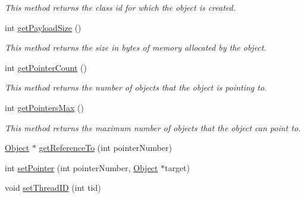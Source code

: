 \begin{DoxyCompactItemize}
\begin{DoxyCompactList}\small\item\em This method returns the class id for which the object is created. \end{DoxyCompactList}\item 
\hypertarget{classtrace_gen_1_1_object_a949827546864cff9dd90328f9efaafcc}{}int \hyperlink{classtrace_gen_1_1_object_a949827546864cff9dd90328f9efaafcc}{get\+Payload\+Size} ()\label{classtrace_gen_1_1_object_a949827546864cff9dd90328f9efaafcc}

\begin{DoxyCompactList}\small\item\em This method returns the size in bytes of memory allocated by the object. \end{DoxyCompactList}\item 
\hypertarget{classtrace_gen_1_1_object_a3446d46c58acdb776d255dfb5ace0326}{}int \hyperlink{classtrace_gen_1_1_object_a3446d46c58acdb776d255dfb5ace0326}{get\+Pointer\+Count} ()\label{classtrace_gen_1_1_object_a3446d46c58acdb776d255dfb5ace0326}

\begin{DoxyCompactList}\small\item\em This method returns the number of objects that the object is pointing to. \end{DoxyCompactList}\item 
\hypertarget{classtrace_gen_1_1_object_a701a65821b1fd68b3a72d13382f6abc5}{}int \hyperlink{classtrace_gen_1_1_object_a701a65821b1fd68b3a72d13382f6abc5}{get\+Pointers\+Max} ()\label{classtrace_gen_1_1_object_a701a65821b1fd68b3a72d13382f6abc5}

\begin{DoxyCompactList}\small\item\em This method returns the maximum number of objects that the object can point to. \end{DoxyCompactList}\item 
\hyperlink{classtrace_gen_1_1_object}{Object} $\ast$ \hyperlink{classtrace_gen_1_1_object_ad6ce1268a470e7f3b7b6dc81a9234f65}{get\+Reference\+To} (int pointer\+Number)
\item 
int \hyperlink{classtrace_gen_1_1_object_ad01e87ea5e509200cb01d5fc14d98401}{set\+Pointer} (int pointer\+Number, \hyperlink{classtrace_gen_1_1_object}{Object} $\ast$target)
\item 
\hypertarget{classtrace_gen_1_1_object_a18685a052617cd37ecb5fc2d45b4a6cf}{}void \hyperlink{classtrace_gen_1_1_object_a18685a052617cd37ecb5fc2d45b4a6cf}{set\+Thread\+I\+D} (int tid)\label{classtrace_gen_1_1_object_a18685a052617cd37ecb5fc2d45b4a6cf}


\end{DoxyCompactItemize}
